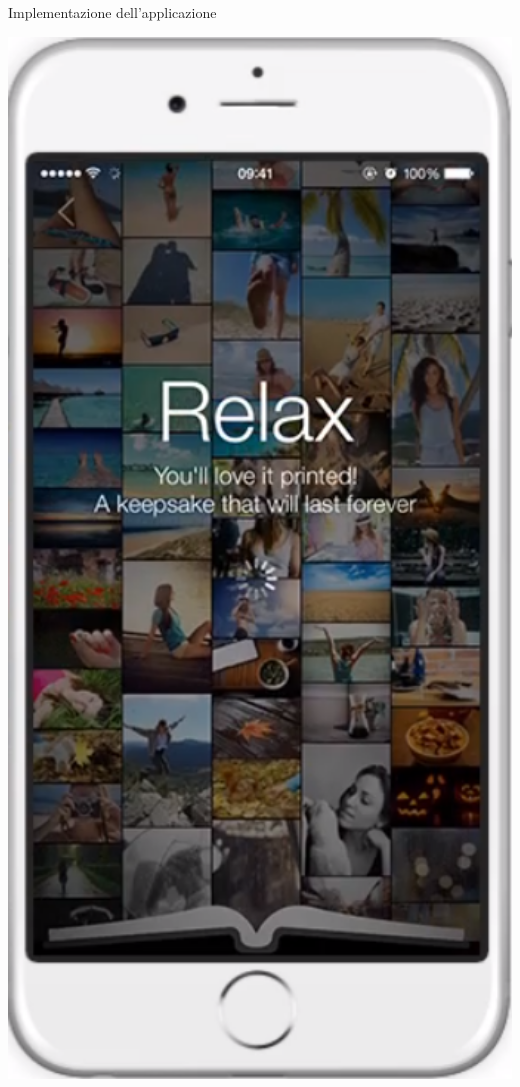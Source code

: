\begin{frame}{Implementazione dell'applicazione}
\begin{minipage}{0.49\textwidth}
\begin{minipage}{0.32\textwidth}
				\end{minipage}
				\begin{minipage}{0.32\textwidth}
					\includegraphics[width=1.0\textwidth]{capitolo_3/immagini/schermata_di_intrattenimento.png}

\end{minipage}
\end{minipage}
\end{frame}
